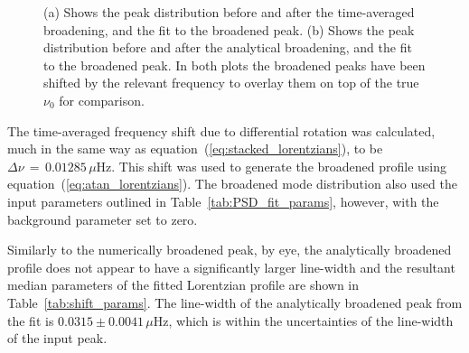 \begin{figure}[ht!]
	\centering
	\qquad
	\caption{(a) Shows the peak distribution before and after the time-averaged broadening, and the fit to the broadened peak. (b) Shows the peak distribution before and after the analytical broadening, and the fit to the broadened peak. In both plots the broadened peaks have been shifted by the relevant frequency to overlay them on top of the true $\nu_0$ for comparison.} \label{fig:shifted_peaks}
\end{figure}


The time-averaged frequency shift due to differential rotation was calculated, much in the same way as equation~(\ref{eq:stacked_lorentzians}), to be $\Delta\nu \, = \,0.01285 \, \mu\mathrm{Hz}$. This shift was used to generate the broadened profile using equation~(\ref{eq:atan_lorentzians}). The broadened mode distribution also used the input parameters outlined in Table~\ref{tab:PSD_fit_params}, however, with the background parameter set to zero.

Similarly to the numerically broadened peak, by eye, the analytically broadened profile does not appear to have a significantly larger line-width and the resultant median parameters of the fitted Lorentzian profile are shown in Table~\ref{tab:shift_params}. The line-width of the analytically broadened peak from the fit is $0.0315 \pm 0.0041 \, \mu\mathrm{Hz} $, which is within the uncertainties of the line-width of the input peak.

